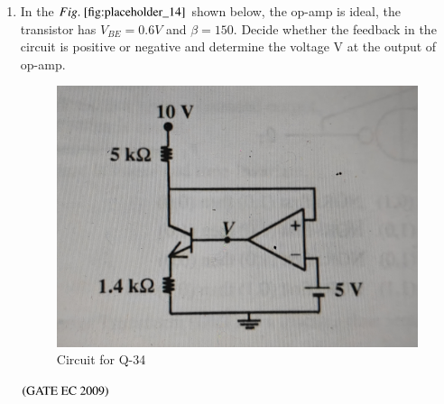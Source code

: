 \documentclass[journal,12pt,onecolumn]{IEEEtran}
\theoremstyle{remark}
\begin{document}
\begin{enumerate}[start=1, label={Q\arabic*.}]
\item In the $\figref{fig:placeholder_14}$ shown below, the op-amp is ideal, the transistor has $V_{BE} = 0.6 V$ and $\beta = 150$. Decide whether the feedback in the circuit is positive or negative and determine the voltage V at the output of op-amp.     
\begin{figure}[H]
    \centering
    \includegraphics[width=0.5\columnwidth]{figs/img_14.jpg}
    \caption{\centering Circuit for Q-34}
    \label{fig:placeholder_14}
\end{figure}
\begin{enumerate}
\end{enumerate}
\hfill $\left(\text{GATE EC 2009}\right)$


\end{enumerate}
\end{document}
